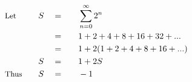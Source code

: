 \begin{alignat*}{5}
&\small\text{Let}&S\quad&=\quad&&\sum_{n=0}^\infty 2^n\\
&\,&\,&=&&1+2+4+8+16+32+...\\
&\,&\,&=&&1+2(1+2+4+8+16+...)\\
&\,&S\quad&=&&1+2S\\
&\small\text{Thus}\quad&S\quad&=&&-1
\end{alignat*}
